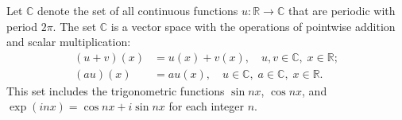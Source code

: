 Let $\mathbb{C}$ denote the set of all continuous functions $u: \mathbb{R} \to \mathbb{C}$ that are periodic with period $2\pi$. The set $\mathbb{C}$ is a vector space with the operations of pointwise addition and scalar multiplication:
\begin{align*}
(u + v)(x) &= u(x) + v(x), \quad u, v \in \mathbb{C}, \; x \in \mathbb{R}; \\
(au)(x) &= a u(x), \quad u \in \mathbb{C}, \; a \in \mathbb{C}, \; x \in \mathbb{R}.
\end{align*}
This set includes the trigonometric functions $\sin nx$, $\cos nx$, and $\exp(inx) = \cos nx + i \sin nx$ for each integer $n$.
